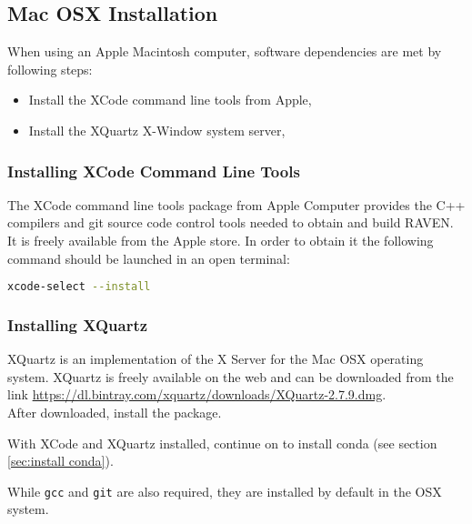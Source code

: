 \subsection{Mac OSX Installation}
\label{sec:install mac}

When using an Apple Macintosh computer, software dependencies are met
by following steps:
\begin{itemize}
  \item Install the XCode command line tools from Apple,
  \item Install the XQuartz  X-Window system server,
\end{itemize}

\subsubsection{Installing XCode Command Line Tools}

The XCode command line tools package from Apple Computer provides the C++
compilers and git source code control tools needed to obtain and build RAVEN.
It is freely available from the Apple store. In order to obtain it the following command should be launched in an open terminal:
\begin{lstlisting}[language=bash]
 xcode-select --install
\end{lstlisting}

\subsubsection{Installing XQuartz}
XQuartz is an implementation of the X Server for the Mac OSX operating system.
XQuartz is freely available on the web and can be downloaded from the link
 \url{https://dl.bintray.com/xquartz/downloads/XQuartz-2.7.9.dmg}.
\\After downloaded, install the package.

With XCode and XQuartz installed, continue on to install conda (see section \ref{sec:install conda}).

\nb While \texttt{gcc} and
\texttt{git} are also required, they are installed by default in the OSX system.

